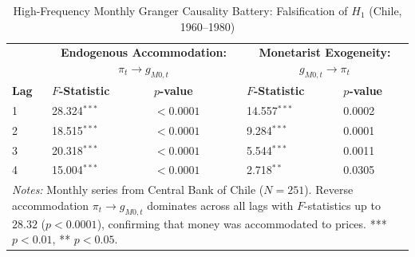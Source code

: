 \begin{table}[H]
\centering
\small
\caption{High-Frequency Monthly Granger Causality Battery: Falsification of $H_1$ (Chile, 1960--1980)}
\label{tab:monthly_h1_falsification}
\begin{tabular}{p{1.2cm}p{3.4cm}p{2.4cm}p{3.4cm}p{2.4cm}}
\toprule
& \multicolumn{2}{c}{\textbf{Endogenous Accommodation: $\pi_t \to g_{M0,t}$}} & \multicolumn{2}{c}{\textbf{Monetarist Exogeneity: $g_{M0,t} \to \pi_t$}} \\
\textbf{Lag} & \textbf{$F$-Statistic} & \textbf{$p$-value} & \textbf{$F$-Statistic} & \textbf{$p$-value} \\
\midrule
1 & 28.324$^{***}$ & $< 0.0001$ & 14.557$^{***}$ & 0.0002 \\
2 & 18.515$^{***}$ & $< 0.0001$ & 9.284$^{***}$ & 0.0001 \\
3 & 20.318$^{***}$ & $< 0.0001$ & 5.544$^{***}$ & 0.0011 \\
4 & 15.004$^{***}$ & $< 0.0001$ & 2.718$^{**}$ & 0.0305 \\
\bottomrule
\multicolumn{5}{p{13.8cm}}{\footnotesize \textit{Notes:} Monthly series from Central Bank of Chile ($N=251$). Reverse accommodation $\pi_t \to g_{M0,t}$ dominates across all lags with $F$-statistics up to $28.32$ ($p < 0.0001$), confirming that money was accommodated to prices. *** $p < 0.01$, ** $p < 0.05$.}
\end{tabular}
\end{table}
